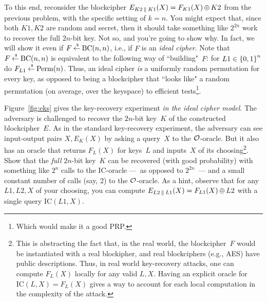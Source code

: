 \documentclass[11pt]{article}
\begin{document}
To this end, reconsider the blockcipher $E_{K2 \:\|\: K1}(X) = F_{K1}(X) {\,\oplus\,} K2$ from the previous problem, with the specific setting of $k=n$.  You might expect that, since both $K1,K2$ are random and secret, then it should take something like $2^{2n}$ work to recover the full $2n$-bit key.  Not so, and you're going to show why.  In fact, we will show it even if $F {\:\stackrel{{\scriptscriptstyle \hspace{0.2em}\$}} {\leftarrow}\:} \mathrm{BC}(n,n)$, i.e., if $F$ is an \emph{ideal cipher}.  Note that $F {\:\stackrel{{\scriptscriptstyle \hspace{0.2em}\$}} {\leftarrow}\:} \mathrm{BC}(n,n)$ is equivalent to the following way of ``building"~$F$: \textsf{for} $L1 \in {\{0,1\}}^{n}$ \textsf{do} $F_{L1} {\:\stackrel{{\scriptscriptstyle \hspace{0.2em}\$}} {\leftarrow}\:} \mathrm{Perm}(n)$.  Thus, an ideal cipher \emph{is} a uniformly random permutation for every key, as opposed to being a blockcipher that ``looks like" a random permutation (on average, over the keyspace) to efficient tests\footnote{Which would make it a good PRP.}.

Figure~\ref{fig:eks} gives the key-recovery experiment \emph{in the ideal cipher model}.  The adversary is challenged to recover the $2n$-bit key~$K$ of the constructed blockcipher~$E$.  As in the standard key-recovery experiment, the adversary can see input-output pairs $X,E_K(X)$ by asking a query~$X$ to the ${\cal O}$-oracle.  But it also has an oracle that returns $F_L(X)$ for keys~$L$ and inputs~$X$ of its choosing\footnote{This is abstracting the fact that, in the real world, the blockcipher~$F$ would be instantiated with a real blockipher, and real blockciphers (e.g., AES) have public descriptions.  Thus, in real world key-recovery attacks, one can compute $F_L(X)$ locally for any valid $L,X$.  Having an explicit oracle for $\mathrm{IC}(L,X)=F_L(X)$ gives a way to account for each local computation in the complexity of the attack.}.
Show that the \emph{full} $2n$-bit key~$K$ can be recovered (with good probability) with something like $2^{n}$ calls to the IC-oracle ---~as opposed to $2^{2n}$~--- and a small constant number of calls (say, 2) to the ${\cal O}$-oracle.  As a hint, observe that for any $L1,L2,X$ of your choosing, you can compute $E_{L2 \:\|\: L1}(X) =F_{L1}(X) {\,\oplus\,} L2$ with a single query $\mathrm{IC}(L1,X)$.
\end{document}
